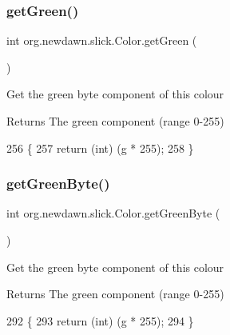 \subsubsection{\texorpdfstring{get\+Green()}{getGreen()}}
{\footnotesize\ttfamily int org.\+newdawn.\+slick.\+Color.\+get\+Green (\begin{DoxyParamCaption}{ }\end{DoxyParamCaption})\hspace{0.3cm}{\ttfamily [inline]}}

Get the green byte component of this colour

\begin{DoxyReturn}{Returns}
The green component (range 0-\/255) 
\end{DoxyReturn}

\begin{DoxyCode}
256                           \{
257         \textcolor{keywordflow}{return} (\textcolor{keywordtype}{int}) (\mbox{\hyperlink{classorg_1_1newdawn_1_1slick_1_1_color_aa6ebff7c102a1476e7b511a78397b753}{g}} * 255);
258     \}
\end{DoxyCode}
\mbox{\label{classorg_1_1newdawn_1_1slick_1_1_color_a79aa0550120abbbf5a9fbaafe9ca74ec}} 
\subsubsection{\texorpdfstring{get\+Green\+Byte()}{getGreenByte()}}
{\footnotesize\ttfamily int org.\+newdawn.\+slick.\+Color.\+get\+Green\+Byte (\begin{DoxyParamCaption}{ }\end{DoxyParamCaption})\hspace{0.3cm}{\ttfamily [inline]}}

Get the green byte component of this colour

\begin{DoxyReturn}{Returns}
The green component (range 0-\/255) 
\end{DoxyReturn}

\begin{DoxyCode}
292                               \{
293         \textcolor{keywordflow}{return} (\textcolor{keywordtype}{int}) (\mbox{\hyperlink{classorg_1_1newdawn_1_1slick_1_1_color_aa6ebff7c102a1476e7b511a78397b753}{g}} * 255);
294     \}
\end{DoxyCode}
\mbox{\label{classorg_1_1newdawn_1_1slick_1_1_color_ae608bf42430199ccdb2b1fa48a903c95}} 
